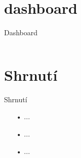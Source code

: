 \documentclass[aspectratio=169,28pt]{beamer}
\begin{document}
\section{dashboard}
\begin{frame}{Dashboard}

\begin{columns}[c]
    \column{5cm}
    
    \column{10cm}
 \end{columns}   
		
\end{frame}

\section{Shrnutí}
\begin{frame}{Shrnutí}
		\begin{itemize}
		\item[•] ...
		\item[•] ...
		\item[•] ...
		\end{itemize}
\end{frame}


\end{document}
